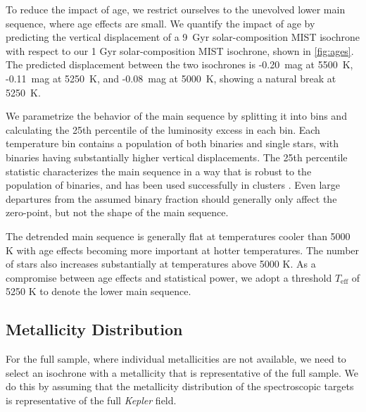 \documentclass[twocolumn]{aastex6}
\newcommand{\Kepler}{\mbox{\textit{Kepler}}}
\newcommand{\Teff}{\ensuremath{T_{\textrm{eff}}}}
\begin{document}
To reduce the impact of age,
we restrict ourselves to the unevolved lower main sequence, where age
effects are small. We quantify the impact of age by predicting the vertical
displacement of a 9~Gyr solar-composition MIST isochrone with respect to our 
1 Gyr solar-composition MIST isochrone, shown in \cref{fig:ages}. The
predicted displacement between the two isochrones is -0.20~mag at 5500~K, 
-0.11~mag at 5250~K, and -0.08~mag at 5000~K, showing a natural break at 
5250~K.

We parametrize the behavior of the main sequence by splitting it into bins
and calculating the 25th percentile of the luminosity excess in each bin. Each 
temperature bin contains a population of both binaries and single stars, with 
binaries having substantially higher vertical displacements. The 25th 
percentile statistic characterizes the main sequence in a way that is robust 
to the population of binaries, and has been used successfully in clusters 
\citep{An06}. Even large departures from the assumed binary fraction should 
generally only affect the zero-point, but not the shape of the main sequence.

The detrended main sequence is generally flat at temperatures cooler than 5000 K 
with age effects becoming more important at hotter temperatures. The number of stars
also increases substantially at temperatures above 5000 K. As a compromise
between age effects and statistical power, we adopt a threshold \Teff{} of 
5250 K to denote the lower main sequence.

\subsection{Metallicity Distribution}

For the full \citet{McQuillan14} sample, where individual metallicities are not
available, we need to select an isochrone with a metallicity that is 
representative of the full sample. We do this by assuming that the metallicity 
distribution of the spectroscopic targets is representative of the full 
\Kepler{} field. 
\end{document}
